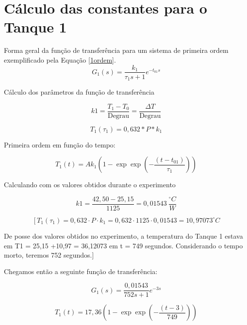 \section{Cálculo das constantes para o Tanque 1}

Forma geral da função de transferência para um sistema de primeira ordem exemplificado pela Equação \ref{1ordem}.
\begin{equation}\label{1ordem}
G_{1}(s)=\frac{k_{1}}{\tau_{1} s+1} e^{-t_{01} s}
\end{equation}

Cálculo dos parâmetros da função de transferência

\begin{equation}\label{key}
k 1=\frac{T_{1}-T_{0}}{\text {Degrau}}=\frac{\Delta T}{\text {Degrau}}
\end{equation}

\begin{equation}\label{key}
T_{1}\left(\tau_{1}\right)=0,632 * P * k_{1}
\end{equation}

Primeira ordem em função do tempo:

\begin{equation}\label{key}
T_{1}(t)=A k_{1}\left(1-\exp \exp \left(-\frac{\left(t-t_{01}\right)}{\tau_{1}}\right)\right)
\end{equation}

Calculando com os valores obtidos durante o experimento

\begin{equation}\label{key}
k 1=\frac{42,50-25,15}{1125}=0,01543 \ \frac{^{\circ} C}{W}
\end{equation}

\begin{equation}\label{key}
\left[T_{1}\left(\tau_{1}\right)=0,632 \cdot P \cdot k_{1}=0,632 \cdot 1125 \cdot 0,01543=10,97073^{\circ} C\right.
\end{equation}


De posse dos valores obtidos no experimento, a temperatura do Tanque 1 estava em T1 = 25,15 +10,97 = 36,12073 em t = 749 segundos. Considerando o tempo morto, teremos 752 segundos.]

Chegamos então a seguinte função de transferência:


\begin{equation}\label{key}
G_{1}(s)=\frac{0,01543}{752 s+1} e^{-3 s}
\end{equation}


\begin{equation}\label{key}
T_{1}(t)=17,36\left(1-\exp \exp \left(-\frac{(t-3)}{749}\right)\right)
\end{equation}
 
